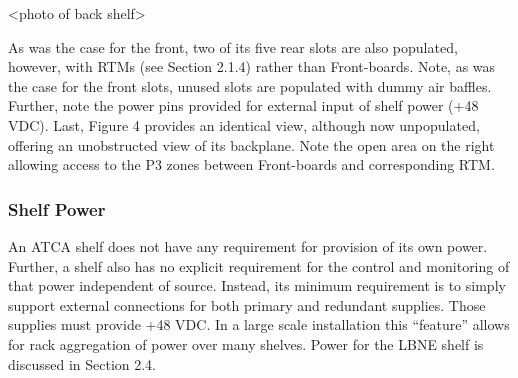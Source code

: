 <photo of back shelf>

As was the case for the front, two of its five rear slots are also populated, however, with RTMs (see Section 2.1.4) rather than Front-boards. Note, as was the case for the front slots, unused slots are populated with dummy air baffles. Further, note the power pins provided for external input of shelf power (+48 VDC). Last, Figure 4 provides an identical view, although now unpopulated, offering an unobstructed view of its backplane. Note the open area on the right allowing access to the P3 zones between Front-boards and corresponding RTM.

\subsubsection{Shelf Power}
\label{sec:shelfpower}
An ATCA shelf does not have any requirement for provision of its own power. Further, a shelf also has no explicit requirement for the control and monitoring of that power independent of source. Instead, its minimum requirement is to simply support external connections for both primary and redundant supplies. Those supplies must provide +48 VDC. In a large scale installation this “feature” allows for rack aggregation of power over many shelves.
Power for the LBNE shelf is discussed in Section 2.4.

